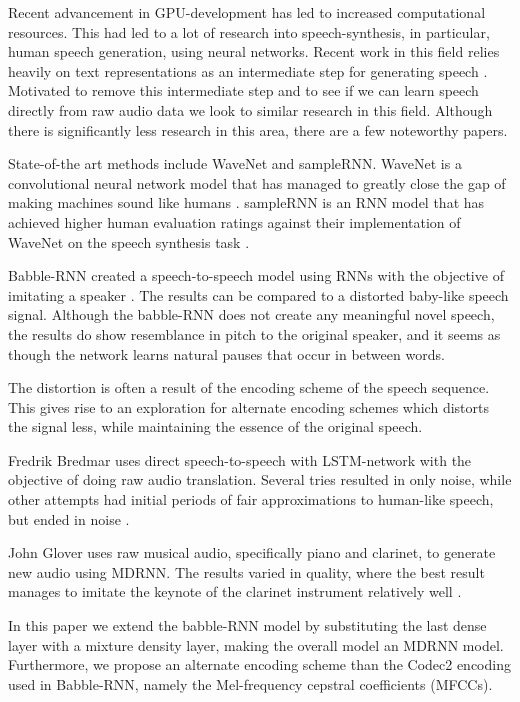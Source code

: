 \documentclass[conference]{IEEEtran}
\begin{document}
Recent advancement in GPU-development has led to increased computational resources. This had led to a lot of research into speech-synthesis, in particular, human speech generation, using neural networks. Recent work in this field relies heavily on text representations as an intermediate step for generating speech \cite{b11, b17}. Motivated to remove this intermediate step and to see if we can learn speech directly from raw audio data we look to similar research in this field. Although there is significantly less research in this area, there are a few noteworthy papers. 

State-of-the art methods include WaveNet and sampleRNN. WaveNet is a convolutional neural network model that has managed to greatly close the gap of making machines sound like humans \cite{b4}. sampleRNN is an RNN model that has achieved higher human evaluation ratings against their implementation of WaveNet on the speech synthesis task \cite{b16}. 

Babble-RNN created a speech-to-speech model using RNNs with the objective of imitating a speaker \cite{b1}. The results can be compared to a distorted baby-like speech signal. Although the babble-RNN does not create any meaningful novel speech, the results do show resemblance in pitch to the original speaker, and it seems as though the network learns natural pauses that occur in between words. 

The distortion is often a result of the encoding scheme of the speech sequence. This gives rise to an exploration for alternate encoding schemes which distorts the signal less, while maintaining the essence of the original speech.

Fredrik Bredmar uses direct speech-to-speech with LSTM-network with the objective of doing raw audio translation. Several tries resulted in only noise, while other attempts had initial periods of fair approximations to human-like speech, but ended in noise \cite{b2}.

John Glover uses raw musical audio, specifically piano and clarinet, to generate new audio using MDRNN. The results varied in quality, where the best result manages to imitate the keynote of the clarinet instrument relatively well \cite{b10}. 

In this paper we extend the babble-RNN model by substituting the last dense layer with a mixture density layer, making the overall model an MDRNN model. Furthermore, we propose an alternate encoding scheme than the Codec2 encoding used in Babble-RNN, namely the Mel-frequency cepstral coefficients (MFCCs).
\end{document}
